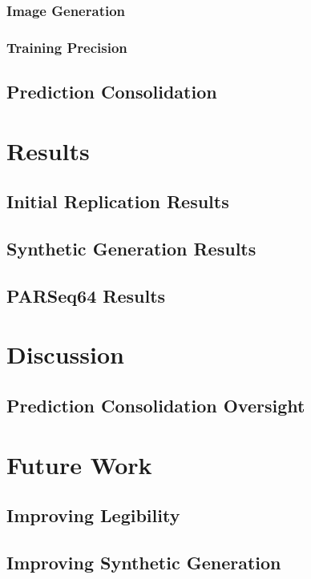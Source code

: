 \documentclass[11pt, letterpaper]{article}
\begin{document}
\subsubsection{Image Generation}

\subsubsection{Training Precision}

\subsection{Prediction Consolidation}

\section{Results}

\subsection{Initial Replication Results}

\subsection{Synthetic Generation Results}

\subsection{PARSeq64 Results}

\section{Discussion}

\subsection{Prediction Consolidation Oversight}

\section{Future Work}

\subsection{Improving Legibility}

\subsection{Improving Synthetic Generation}


\clearpage


\end{document}
